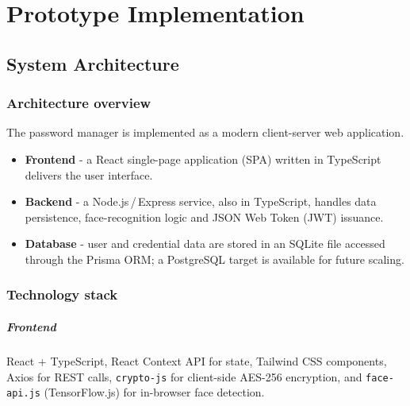 
\chapter{Prototype Implementation}%
\label{ch:implementatie}


\section{System Architecture}

\subsection{Architecture overview}
The password manager is implemented as a modern client-server web application.  
\begin{itemize}
  \item \textbf{Frontend} - a React single-page application (SPA) written in TypeScript delivers the user interface.  
  \item \textbf{Backend} - a Node.js\,/\,Express service, also in TypeScript, handles data persistence, face-recognition logic and JSON Web Token (JWT) issuance.  
  \item \textbf{Database} - user and credential data are stored in an SQLite file accessed through the Prisma ORM; a PostgreSQL target is available for future scaling.  
\end{itemize}

\subsection{Technology stack}
\paragraph{Frontend}
React {+} TypeScript, React Context API for state, Tailwind CSS components, Axios for REST calls, \texttt{crypto-js} for client-side AES-256 encryption, and \texttt{face-api.js} (TensorFlow.js) for in-browser face detection.

